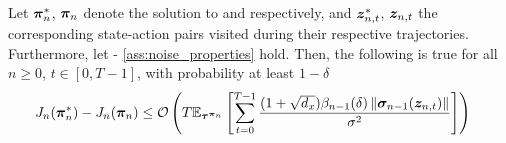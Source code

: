 \begin{corollary}
     Let ${\bm{\pi}}^*_n$, ${\bm{\pi}}_n$ denote the solution to  and  
 respectively, and ${\bm{z}}^*_{n, t}$, ${\bm{z}}_{n, t}$ the corresponding state-action pairs visited during their respective trajectories. Furthermore, let  - \ref{ass:noise_properties} hold. Then, the following is true for all $n\geq 0$, $t \in  [0, T-1]$, with probability at least $1-\delta$
 \begin{align*}
     J_n({\bm{\pi}}_n^*) - J_n({\bm{\pi}}_n) &\leq {\mathcal{O}}\left(T \mathbb{E}_{{\bm{\tau}}^{{\bm{\pi}}_n}} \left[\sum^{T-1}_{t=0} \frac{(1 + \sqrt{d_x}) \beta_{n-1}(\delta) \left\lVert{\bm{\sigma}}_{n-1}({\bm{z}}_{n, t})\right\rVert}{\sigma^2}\right]\right)
 \end{align*}
\label{cor:bounding_diff_in_performance}
\end{corollary}
